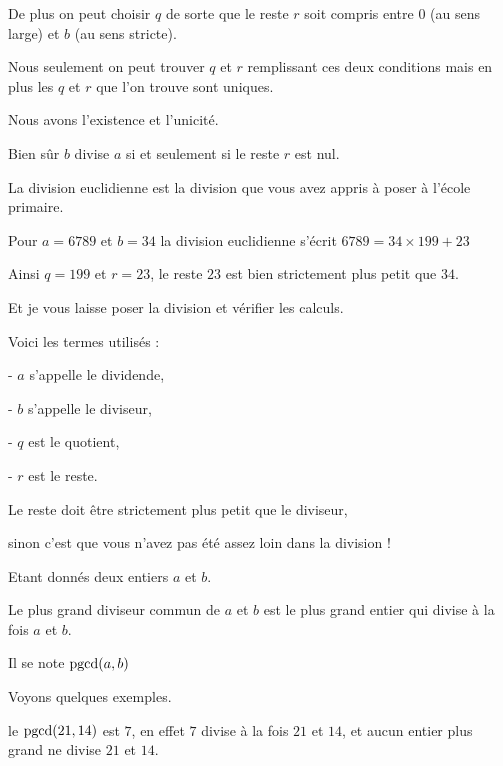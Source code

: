 De plus on peut choisir $q$ de sorte que le reste $r$ soit compris entre 
$0$ (au sens large) et $b$ (au sens stricte).

\change

Nous seulement on peut trouver $q$ et $r$ remplissant ces deux conditions
mais en plus les $q$ et $r$ que l'on trouve sont uniques.

\change


Nous avons l'existence et l'unicité.


Bien sûr $b$ divise $a$ si et seulement si le reste $r$ est nul.

\change

La division euclidienne est la division que vous avez appris à poser
à l'école primaire.

Pour $a=6789$ et $b=34$ la division euclidienne s'écrit
 $6789= 34 \times 199 + 23$

Ainsi $q=199$ et $r=23$, le reste $23$ est bien strictement plus petit que $34$.

\change

Et je vous laisse poser la division et vérifier les calculs.

\change

Voici les termes utilisés :

 - $a$ s'appelle le dividende,

 - $b$ s'appelle le diviseur,

 - $q$ est le quotient,

 - $r$ est le reste.

Le reste doit être strictement plus petit que le diviseur, 

sinon c'est que vous n'avez pas été assez
loin dans la division !



\diapo

Etant donnés deux entiers $a$ et $b$.

Le plus grand diviseur commun de $a$ et $b$ est le plus grand entier qui divise à la fois $a$ et
$b$.

\change

Il se note $\mathop{\mathrm{pgcd}}\nolimits(a,b)$

\change

Voyons quelques exemples.

le $\mathop{\mathrm{pgcd}}\nolimits(21,14)$ est $7$, en effet $7$ divise à la fois $21$ et $14$,
et aucun entier plus grand ne divise $21$ et $14$.

\change

